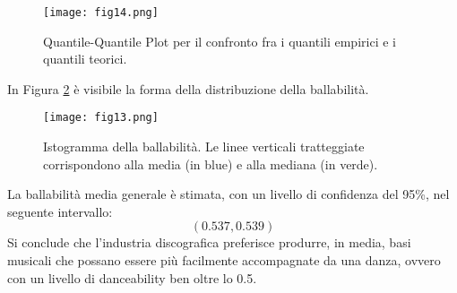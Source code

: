 \documentclass[fleqn,10pt]{SelfArx} %
\begin{document}
\begin{figure}[H]
    \centering
    \texttt{[image: fig14.png]}
    \label{fig:fig14}
    \caption{Quantile-Quantile Plot per il confronto fra i quantili empirici e i quantili teorici.}
\end{figure}
In Figura \ref{fig:fig13} è visibile la forma della distribuzione della ballabilità.
\begin{figure}[H]
    \centering
    \texttt{[image: fig13.png]}
    \label{fig:fig13}
    \caption{Istogramma della ballabilità. Le linee verticali tratteggiate corrispondono alla media (in blue) e alla mediana (in verde).}
\end{figure}
La ballabilità media generale è stimata, con un livello di confidenza del 95\%, nel seguente intervallo:
\begin{equation}
    (0.537, 0.539)
\end{equation}
Si conclude che l'industria discografica preferisce produrre, in media, basi musicali che possano essere più facilmente accompagnate da una danza, ovvero con un livello di {danceability} ben oltre lo 0.5.
\end{document}
